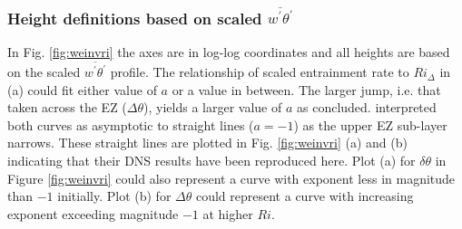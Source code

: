 \subsubsection{Height definitions based on scaled $\overline{w^{'}\theta^{'}}$}
In Fig. \ref{fig:weinvri} the axes are in log-log coordinates and all heights are based on the scaled $\overline{w^{'}\theta^{'}}$ profile. The relationship of scaled entrainment rate to $Ri_{\Delta}$ in (a) could fit either value of $a$ or a value in between.  The larger jump, i.e. that taken across the EZ ($\Delta \theta$), yields a larger value of $a$ as \cite{FedConzMir04} concluded.  \cite{GarciaMellado} interpreted both curves as asymptotic to straight lines ($a=-1$) as the upper EZ sub-layer narrows.  These straight lines are plotted in Fig. \ref{fig:weinvri} (a) and (b) indicating that their DNS results have been reproduced here.   Plot (a) for $\delta \theta$ in Figure \ref{fig:weinvri} could also represent a curve with exponent less in magnitude than $-1$ initially.  Plot (b) for $\Delta \theta$ could represent a curve with increasing exponent exceeding magnitude $-1$ at higher $Ri$.\\

